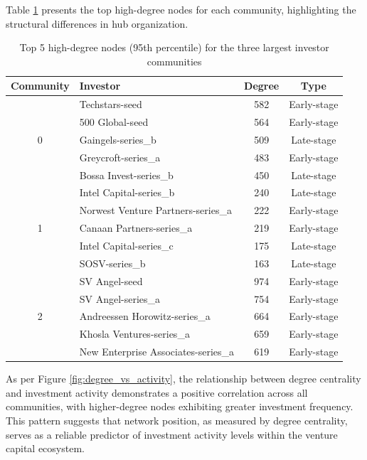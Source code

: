 Table \ref{tab:high_degree_nodes} presents the top high-degree nodes for each community, highlighting the structural differences in hub organization.

\begin{table}[ht]
\centering
\begin{tabular}{|c|l|c|c|}
\hline
\textbf{Community} & \textbf{Investor} & \textbf{Degree} & \textbf{Type} \\
\hline
\multirow{5}{*}{0} & Techstars-seed & 582 & Early-stage \\
& 500 Global-seed & 564 & Early-stage \\
& Gaingels-series\_b & 509 & Late-stage \\
& Greycroft-series\_a & 483 & Early-stage \\
& Bossa Invest-series\_b & 450 & Late-stage \\
\hline
\multirow{5}{*}{1} & Intel Capital-series\_b & 240 & Late-stage \\
& Norwest Venture Partners-series\_a & 222 & Early-stage \\
& Canaan Partners-series\_a & 219 & Early-stage \\
& Intel Capital-series\_c & 175 & Late-stage \\
& SOSV-series\_b & 163 & Late-stage \\
\hline
\multirow{5}{*}{2} & SV Angel-seed & 974 & Early-stage \\
& SV Angel-series\_a & 754 & Early-stage \\
& Andreessen Horowitz-series\_a & 664 & Early-stage \\
& Khosla Ventures-series\_a & 659 & Early-stage \\
& New Enterprise Associates-series\_a & 619 & Early-stage \\
\hline
\end{tabular}
\caption{Top 5 high-degree nodes (95th percentile) for the three largest investor communities}
\label{tab:high_degree_nodes}
\end{table}

As per Figure \ref{fig:degree_vs_activity}, the relationship between degree centrality and investment activity demonstrates a positive correlation across all communities, with higher-degree nodes exhibiting greater investment frequency. This pattern suggests that network position, as measured by degree centrality, serves as a reliable predictor of investment activity levels within the venture capital ecosystem.


